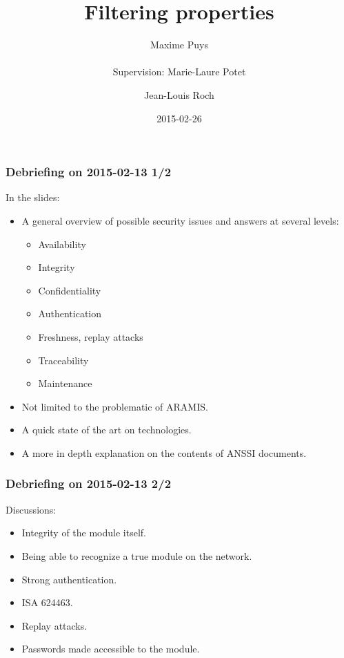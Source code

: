 \documentclass{beamer}
\title{Filtering properties}
\author[Maxime Puys]{Maxime Puys\\~\\Supervision: Marie-Laure Potet \and Jean-Louis Roch}
\date{2015-02-26}
\begin{document}
\begin{frame}
    \maketitle
\end{frame}

\begin{frame}
    \frametitle{Debriefing on 2015-02-13 1/2}

    In the slides:
    \begin{itemize}
        \item A general overview of possible security issues and answers at several levels:
            \begin{itemize}
                \item Availability
                \item Integrity
                \item Confidentiality
                \item Authentication
                \item Freshness, replay attacks
                \item Traceability
                \item Maintenance
            \end{itemize}
            \vfill
        \item Not limited to the problematic of ARAMIS.
            \vfill
        \item A quick state of the art on technologies.
            \vfill
        \item A more in depth explanation on the contents of ANSSI documents.
    \end{itemize}
\end{frame}

\begin{frame}
    \frametitle{Debriefing on 2015-02-13 2/2}
    
    Discussions:
    \begin{itemize}
        \item Integrity of the module itself.
            \vfill
        \item Being able to recognize a true module on the network.
            \vfill
        \item Strong authentication.
            \vfill
        \item ISA 624463.
            \vfill
        \item Replay attacks.
            \vfill
        \item Passwords made accessible to the module.
    \end{itemize}
\end{frame}
\end{document}
